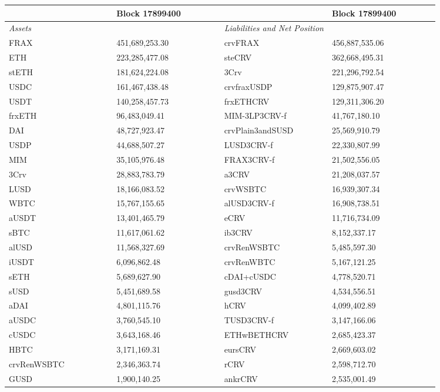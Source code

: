 
\begin{longtable}{@{}p{0.25\linewidth}p{0.25\linewidth}p{0.25\linewidth}p{0.25\linewidth}@{}}

\toprule


& Block 17899400 & & Block 17899400 \\

\midrule
\textit{Assets} & & \textit{Liabilities and Net Position} \\
FRAX & 451,689,253.30 & crvFRAX &456,887,535.06 \\
ETH & 223,285,477.08 & steCRV &362,668,495.31 \\
stETH & 181,624,224.08 & 3Crv &221,296,792.54 \\
USDC & 161,467,438.48 & crvfraxUSDP &129,875,907.47 \\
USDT & 140,258,457.73 & frxETHCRV &129,311,306.20 \\
frxETH & 96,483,049.41 & MIM-3LP3CRV-f &41,767,180.10 \\
DAI & 48,727,923.47 & crvPlain3andSUSD &25,569,910.79 \\
USDP & 44,688,507.27 & LUSD3CRV-f &22,330,807.99 \\
MIM & 35,105,976.48 & FRAX3CRV-f &21,502,556.05 \\
3Crv & 28,883,783.79 & a3CRV &21,208,037.57 \\
LUSD & 18,166,083.52 & crvWSBTC &16,939,307.34 \\
WBTC & 15,767,155.65 & alUSD3CRV-f &16,908,738.51 \\
aUSDT & 13,401,465.79 & eCRV &11,716,734.09 \\
sBTC & 11,617,061.62 & ib3CRV &8,152,337.17 \\
alUSD & 11,568,327.69 & crvRenWSBTC &5,485,597.30 \\
iUSDT & 6,096,862.48 & crvRenWBTC &5,167,121.25 \\
sETH & 5,689,627.90 & cDAI+cUSDC &4,778,520.71 \\
sUSD & 5,451,689.58 & gusd3CRV &4,534,556.51 \\
aDAI & 4,801,115.76 & hCRV &4,099,402.89 \\
aUSDC & 3,760,545.10 & TUSD3CRV-f &3,147,166.06 \\
cUSDC & 3,643,168.46 & ETHwBETHCRV &2,685,423.37 \\
HBTC & 3,171,169.31 & eursCRV &2,669,603.02 \\
crvRenWSBTC & 2,346,363.74 & rCRV &2,598,712.70 \\
GUSD & 1,900,140.25 & ankrCRV &2,535,001.49 \\

\end{longtable}
